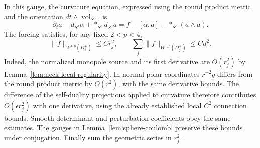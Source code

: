 \documentclass[11pt]{amsart}
\theoremstyle{definition}
\theoremstyle{remark}
\theoremstyle{plain}
\begin{document}
In this gauge, the curvature equation, expressed using the round
product metric and the orientation $dt\wedge\operatorname{vol}_{S^3}$,
is
\begin{equation}\label{eq:neck-curvature-equation}
 \partial_ta-d_{S^3}\alpha+*_{S^3}d_{S^3}a
 =f-[\alpha,a]-*_{S^3}(a\wedge a).
\end{equation}
The forcing satisfies, for any fixed $2<p<4$,
\begin{equation}\label{eq:neck-forcing}
 \|f\|_{W^{1,p}(D_j^+)}\le Cr_j^2,
 \qquad\sum_j\|f\|_{W^{1,p}(D_j^+)}\le Cd^2.
\end{equation}
Indeed, the normalized monopole source and its first derivative are
$O(r_j^2)$ by Lemma~\ref{lem:neck-local-regularity}.  In normal
polar coordinates $r^{-2}g$ differs from the round product metric
by $O(r^2)$, with the same derivative bounds.  The difference of
the self-duality projections applied to curvature therefore contributes
$O(\epsilon r_j^2)$ with one derivative, using the already established
local $C^2$ connection bounds.  Smooth determinant and perturbation
coefficients obey the same estimates.  The gauges in
Lemma~\ref{lem:sphere-coulomb} preserve these bounds under conjugation.
Finally sum the geometric series in $r_j^2$.
\end{document}
